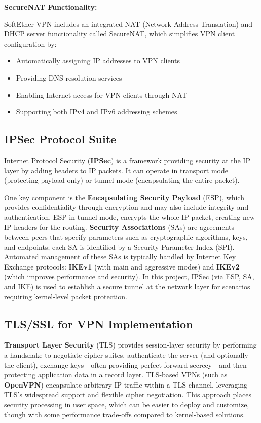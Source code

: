 \noindent
\textbf{SecureNAT Functionality:}

\noindent
SoftEther VPN includes an integrated NAT (Network Address Translation) and DHCP server functionality called SecureNAT, which simplifies VPN client configuration by:

\begin{itemize}
    \item Automatically assigning IP addresses to VPN clients
    \item Providing DNS resolution services
    \item Enabling Internet access for VPN clients through NAT
    \item Supporting both IPv4 and IPv6 addressing schemes
\end{itemize}

\subsection{IPSec Protocol Suite}

Internet Protocol Security (\textbf{IPSec}) is a framework providing security at the IP layer by adding headers to IP packets. It can operate in transport mode (protecting payload only) or tunnel mode (encapsulating the entire packet).

\noindent
One key component is the \textbf{Encapsulating Security Payload} (ESP), which provides confidentiality through encryption and may also include integrity and authentication. ESP in tunnel mode, encrypts the whole IP packet, creating new IP headers for the routing. \textbf{Security Associations} (SAs) are agreements between peers that specify parameters such as cryptographic algorithms, keys, and endpoints; each SA is identified by a Security Parameter Index (SPI). Automated management of these SAs is typically handled by Internet Key Exchange protocols: \textbf{IKEv1} (with main and aggressive modes) and \textbf{IKEv2} (which improves performance and security). In this project, IPSec (via ESP, SA, and IKE) is used to establish a secure tunnel at the network layer for scenarios requiring kernel-level packet protection.

\subsection{TLS/SSL for VPN Implementation}

\textbf{Transport Layer Security} (TLS) provides session-layer security by performing a handshake to negotiate cipher suites, authenticate the server (and optionally the client), exchange keys—often providing perfect forward secrecy—and then protecting application data in a record layer. TLS-based VPNs (such as \textbf{OpenVPN}) encapsulate arbitrary IP traffic within a TLS channel, leveraging TLS’s widespread support and flexible cipher negotiation. This approach places security processing in user space, which can be easier to deploy and customize, though with some performance trade-offs compared to kernel-based solutions.

